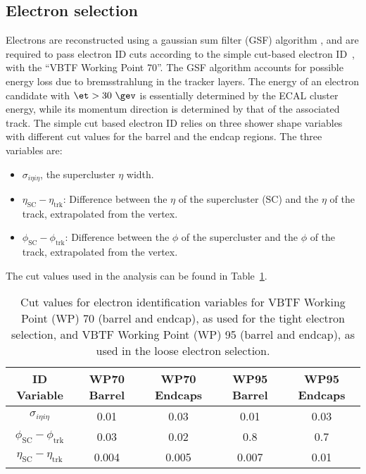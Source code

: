 \subsection{Electron selection}
\label{sec:electron_cuts}
Electrons are reconstructed using a gaussian sum 
filter (GSF) algorithm \cite{CMS-PAS-EGM-10-004},
and are required to pass electron ID cuts according 
to the simple cut-based electron ID~\cite{simplecutbasedelectronid}, 
with the ``VBTF Working Point 70''. 
The GSF algorithm accounts for possible energy loss due to
bremsstrahlung in the tracker layers.
The energy of an electron candidate with $\et>30~\gev$ is essentially
determined by the ECAL cluster energy, while its momentum direction
is determined by that of the associated track.
The simple cut based electron ID relies on three shower
shape variables with different cut values for the barrel and
the endcap regions. The three variables are:
\begin{itemize}
\item $\sigma_{i\eta i\eta}$, the supercluster $\eta$ width.
\item $\eta_{\mathrm{SC}} - \eta_{\mathrm{trk}}$: Difference between
      the $\eta$ of the supercluster (SC) and the $\eta$ of the track,
      extrapolated from the vertex.
\item $\phi_{\mathrm{SC}} - \phi_{\mathrm{trk}}$: Difference between
      the $\phi$ of the supercluster and the $\phi$ of the track,
      extrapolated from the vertex.
\end{itemize}
The cut values used in the analysis can be found in
Table~\ref{tab:EleID}.
\begin{table}[t]
\begin{center}
{\footnotesize
\begin{tabular}{|c|c|c|c|c|}
\hline
ID Variable & WP70 Barrel & WP70 Endcaps & WP95 Barrel & WP95 Endcaps  \\
\hline
$\sigma_{i\eta i\eta}$ & 0.01 & 0.03 & 0.01 & 0.03 \\
$\phi_{\mathrm{SC}} - \phi_{\mathrm{trk}}$ & 0.03 & 0.02 & 0.8 & 0.7 \\
$\eta_{\mathrm{SC}} - \eta_{\mathrm{trk}}$ & 0.004 & 0.005 & 0.007 & 0.01 \\
\hline
\end{tabular}
\caption[.]{\label{tab:EleID} Cut values for electron identification
variables for VBTF Working Point (WP) 70 (barrel and endcap), as used
for the tight electron selection, and VBTF Working Point (WP) 95
(barrel and endcap), as used in the loose electron selection.}}
\end{center}
\end{table}

